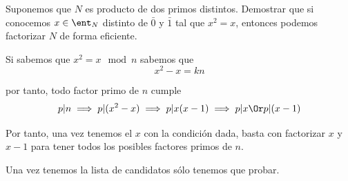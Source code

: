 \begin{problem}[8]
Suponemos que $N$ es producto de dos primos distintos.
Demostrar que si conocemos  $x\in \ent_N$ distinto de $\bar 0$ y
$\bar 1$ tal que $x^2=x$, entonces podemos factorizar $N$ de forma
eficiente.
\solution


Si sabemos que $x^2=x \mod n$ sabemos que
\[x^2-x = kn\]

por tanto, todo factor primo de $n$ cumple
\[p|n \implies p|(x^2-x) \implies p|x(x-1)\implies p|x \Or p|(x-1)\]

Por tanto, una vez tenemos el $x$ con la condición dada, basta con factorizar $x$ y $x-1$ para tener todos los posibles factores primos de $n$.

Una vez tenemos la lista de candidatos sólo tenemos que probar.
\end{problem}









